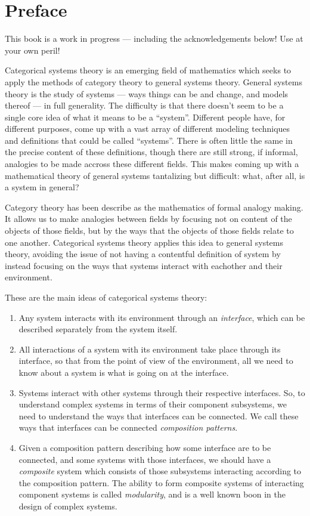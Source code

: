 \documentclass[DynamicalBook]{subfiles}
\begin{document}
%


\setcounter{chapter}{0}%


\chapter{Preface}\label{chapter.0}

This book is a work in progress --- including the acknowledgements below! Use at your own peril!

Categorical systems theory is an emerging field of mathematics which seeks to apply the methods of category theory to general systems theory. General systems theory is the study of systems --- ways things can be and change, and models thereof --- in full generality. The difficulty is that there doesn't seem to be a single core idea of what it means to be a ``system''. Different people have, for different purposes, come up with a vast array of different modeling techniques and definitions that could be called ``systems''. There is often little the same in the precise content of these definitions, though there are still strong, if informal, analogies to be made accross these different fields. This makes coming up with a mathematical theory of general systems tantalizing but difficult: what, after all, is a system in general?

Category theory has been describe as the mathematics of formal analogy making. It allows us to make analogies between fields by focusing not on content of the objects of those fields, but by the ways that the objects of those fields relate to one another. Categorical systems theory applies this idea to general systems theory, avoiding the issue of not having a contentful definition of system by instead focusing on the ways that systems interact with eachother and their environment.

These are the main ideas of categorical systems theory:
\begin{enumerate}
\item Any system interacts with its environment through an \emph{interface}, which can be described separately from the system itself.
\item All interactions of a system with its environment take place through its interface, so that from the point of view of the environment, all we need to know about a system is what is going on at the interface.
\item Systems interact with other systems through their respective interfaces. So, to understand complex systems in terms of their component subsystems, we need to understand the ways that interfaces can be connected. We call these ways that interfaces can be connected \emph{composition patterns}.
\item Given a composition pattern describing how some interface are to be connected, and some systems with those interfaces, we should have a \emph{composite} system which consists of those subsystems interacting according to the composition pattern. The ability to form composite systems of interacting component systems is called \emph{modularity}, and is a well known boon in the design of complex systems.
\end{enumerate}
\end{document}
